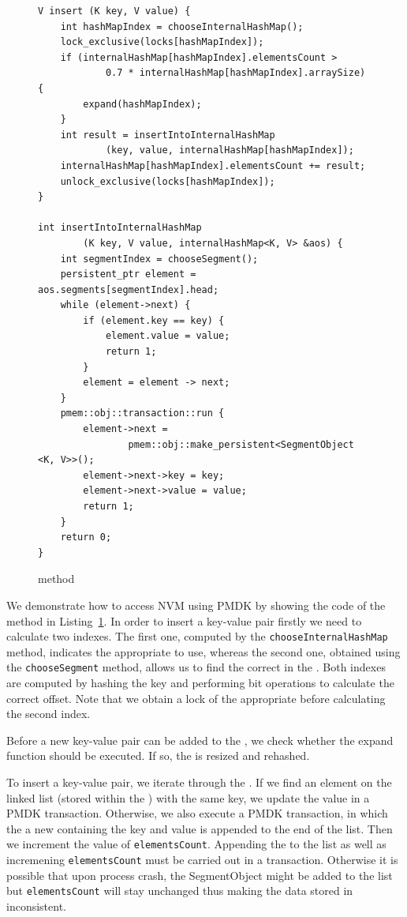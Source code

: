 \begin{figure}[ht]
\renewcommand{\figurename}{Listing}
\begin{lstlisting}
V insert (K key, V value) {
    int hashMapIndex = chooseInternalHashMap();
    lock_exclusive(locks[hashMapIndex]);
    if (internalHashMap[hashMapIndex].elementsCount > 
            0.7 * internalHashMap[hashMapIndex].arraySize) {
        expand(hashMapIndex);
    }
    int result = insertIntoInternalHashMap
            (key, value, internalHashMap[hashMapIndex]);
    internalHashMap[hashMapIndex].elementsCount += result;
    unlock_exclusive(locks[hashMapIndex]);
}
    
int insertIntoInternalHashMap
        (K key, V value, internalHashMap<K, V> &aos) {
    int segmentIndex = chooseSegment();
    persistent_ptr element = aos.segments[segmentIndex].head;
    while (element->next) {
        if (element.key == key) {
            element.value = value;
            return 1;
        } 
        element = element -> next;
    }
    pmem::obj::transaction::run {
        element->next = 
                pmem::obj::make_persistent<SegmentObject <K, V>>();
        element->next->key = key;
        element->next->value = value;
        return 1;
    }
    return 0;
}
\end{lstlisting}
\renewcommand{\figurename}{Listing}
\caption{\insertMethod method}
\label{insertMethod}
\end{figure}
    
    We demonstrate how to access NVM using PMDK by showing the code of the \insertMethod method in Listing~\ref{insertMethod}. In order to insert a  key-value pair firstly we need to calculate two indexes. The first one, computed by the \texttt{choose\-Internal\-HashMap} method, indicates the appropriate \internalHashMap to use, whereas the second one, obtained using the \texttt{choose\-Segment} method, allows us to find the correct \Segment in the \internalHashMap. Both indexes are computed by hashing the key and performing bit operations to calculate the correct offset. Note that we obtain a lock of the appropriate \internalHashMap before calculating the second index. 
    
    Before a new key-value pair can be added to the \Segment, we check whether the expand function should be executed. If so, the \internalHashMap is resized and rehashed. 
    
    To insert a key-value pair, we iterate through the \Segment. If we find an element on the linked list (stored within the \Segment) with the same key, we update the value in a PMDK transaction. Otherwise, we also execute a PMDK transaction, in which the a new \SegmentObject containing the key and value is appended to the end of the list. Then we increment the value of \texttt{elementsCount}. Appending the \SegmentObject to the list as well as incremening \texttt{elementsCount} must be carried out in a transaction. Otherwise it is possible that upon process crash, the SegmentObject might be added to the list but \texttt{elementsCount} will stay unchanged thus making the data stored in \internalHashMap inconsistent.
        
